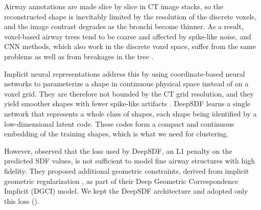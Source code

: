 
Airway annotations are made slice by slice in CT image stacks, so the reconstructed shape is
inevitably limited by the resolution of the discrete voxels, and the image contrast degrades
as the bronchi become thinner. As a result, voxel-based airway trees tend to be coarse and
affected by spike-like noise, and CNN methods, which also work in the discrete voxel
space, suffer from the same problems as well as from breakages in the tree \cite{zhang2024}.

Implicit neural representations address this by using coordinate-based neural
networks to parameterize a shape in continuous physical space instead of on a voxel grid.
They are therefore not bounded by the CT grid resolution, and they yield smoother shapes
with fewer spike-like artifacts \cite{park2019,zhang2024}. DeepSDF \cite{park2019} learns a
single network that represents a whole class of shapes, each shape being identified by a
low-dimensional latent code. These codes form a compact and continuous embedding of the
training shapes, which is what we need for clustering.

However, \citet{zhang2024} observed that the loss used by DeepSDF, an L1 penalty on the
predicted SDF values, is not sufficient to model fine airway structures with high fidelity.
They proposed additional geometric constraints, derived from implicit geometric
regularization \cite{gropp2020}, as part of their Deep Geometric Correspondence Implicit
(DGCI) model. We kept the DeepSDF architecture and adopted only this loss
().


